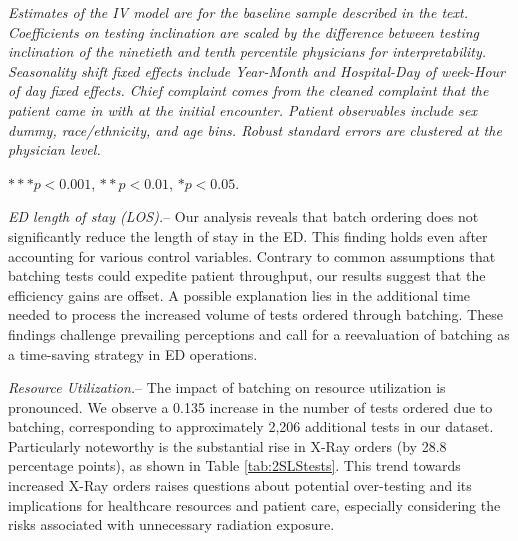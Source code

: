 \documentclass[,,nonblindrev]{informs}
\begin{document}
\begin{table}[!htbp]
\begin{tablenotes}
\small
\item \textit{Estimates of the IV model are for the baseline sample described in the text. Coefficients on testing inclination are scaled by the difference between testing inclination of the ninetieth and tenth percentile physicians for interpretability. Seasonality shift fixed effects include Year-Month and Hospital-Day of week-Hour of day fixed effects. Chief complaint comes from the cleaned complaint that the patient came in with at the initial encounter. Patient observables include sex dummy, race/ethnicity, and age bins. Robust standard errors are clustered at the physician level.}
\item $*** p < 0.001$, $** p < 0.01$, $* p < 0.05$.
\end{tablenotes}
\end{table}

\emph{ED length of stay (LOS).}-- Our analysis reveals that batch
ordering does not significantly reduce the length of stay in the ED.
This finding holds even after accounting for various control variables.
Contrary to common assumptions that batching tests could expedite
patient throughput, our results suggest that the efficiency gains are
offset. A possible explanation lies in the additional time needed to
process the increased volume of tests ordered through batching. These
findings challenge prevailing perceptions and call for a reevaluation of
batching as a time-saving strategy in ED operations.

\emph{Resource Utilization.}-- The impact of batching on resource
utilization is pronounced. We observe a 0.135 increase in the number of
tests ordered due to batching, corresponding to approximately 2,206
additional tests in our dataset. Particularly noteworthy is the
substantial rise in X-Ray orders (by 28.8 percentage points), as shown
in Table \ref{tab:2SLStests}. This trend towards increased X-Ray orders
raises questions about potential over-testing and its implications for
healthcare resources and patient care, especially considering the risks
associated with unnecessary radiation exposure.
\end{document}
